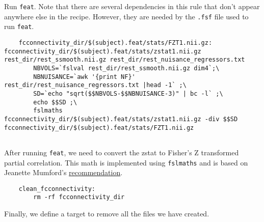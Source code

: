Run \texttt{feat}. Note that there are several dependencies in this
rule that don't appear anywhere else in the recipe. However, they are
needed by the \texttt{.fsf} file used to run \texttt{feat}.

\begin{lstlisting}
	fcconnectivity_dir/$(subject).feat/stats/FZT1.nii.gz: fcconnectivity_dir/$(subject).feat/stats/zstat1.nii.gz rest_dir/rest_ssmooth.nii.gz rest_dir/rest_nuisance_regressors.txt 
		NBVOLS=`fslval rest_dir/rest_ssmooth.nii.gz dim4`;\
		NBNUISANCE=`awk '{print NF}' rest_dir/rest_nuisance_regressors.txt |head -1` ;\
		SD=`echo "sqrt($$NBVOLS-$$NBNUISANCE-3)" | bc -l` ;\
		echo $$SD ;\
		fslmaths fcconnectivity_dir/$(subject).feat/stats/zstat1.nii.gz -div $$SD fcconnectivity_dir/$(subject).feat/stats/FZT1.nii.gz 
		
\end{lstlisting}

After running \texttt{feat}, we need to convert the zstat to Fisher's
Z transformed partial correlation. This math is implemented using
\texttt{fslmaths} and is based on Jeanette Mumford's \href{http://mumfordbrainstats.tumblr.com/post/125523326931/how-to-convert-zstat-images-to-fishers-z}{recommendation}.  

\begin{lstlisting}
	clean_fcconnectivity:
		rm -rf fcconnectivity_dir
\end{lstlisting}

Finally, we define a target to remove all the files we have created.

